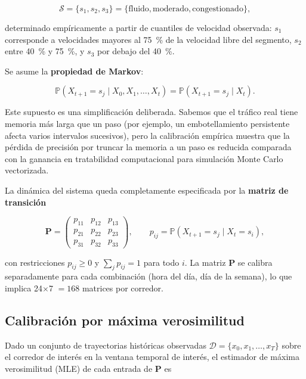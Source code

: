 \documentclass[11pt,a4paper]{article}
\newcommand{\Prob}{\mathbb{P}}
\begin{document}
\begin{equation}
\mathcal{S} = \{s_1, s_2, s_3\} =
\{\text{fluido}, \text{moderado}, \text{congestionado}\},
\end{equation}

determinado empíricamente a partir de cuantiles de velocidad
observada: $s_1$ corresponde a velocidades mayores al
\SI{75}{\percent} de la velocidad libre del segmento, $s_2$
entre \SI{40}{\percent} y \SI{75}{\percent}, y $s_3$ por debajo
del \SI{40}{\percent}.

Se asume la \textbf{propiedad de Markov}:

\begin{equation}
\Prob(X_{t+1} = s_j \mid X_0, X_1, \ldots, X_t) =
\Prob(X_{t+1} = s_j \mid X_t).
\end{equation}

Este supuesto es una simplificación deliberada. Sabemos que el
tráfico real tiene memoria más larga que un paso (por ejemplo,
un embotellamiento persistente afecta varios intervalos
sucesivos), pero la calibración empírica muestra que la pérdida
de precisión por truncar la memoria a un paso es reducida
comparada con la ganancia en tratabilidad computacional para
simulación Monte Carlo vectorizada.

La dinámica del sistema queda completamente especificada por la
\textbf{matriz de transición}

\begin{equation}
\mathbf{P} =
\begin{pmatrix}
p_{11} & p_{12} & p_{13}\\
p_{21} & p_{22} & p_{23}\\
p_{31} & p_{32} & p_{33}
\end{pmatrix}, \qquad p_{ij} = \Prob(X_{t+1}=s_j \mid X_t=s_i),
\end{equation}

con restricciones $p_{ij} \geq 0$ y
$\sum_j p_{ij} = 1$ para todo $i$. La matriz $\mathbf{P}$ se
calibra separadamente para cada combinación (hora del día, día
de la semana), lo que implica \num{24}$\times$\num{7} $=
\num{168}$ matrices por corredor.

\subsection{Calibración por máxima verosimilitud}

Dado un conjunto de trayectorias históricas observadas
$\mathcal{D} = \{x_0, x_1, \ldots, x_T\}$ sobre el corredor de
interés en la ventana temporal de interés, el estimador de
máxima verosimilitud (MLE) de cada entrada de $\mathbf{P}$ es
\end{document}
